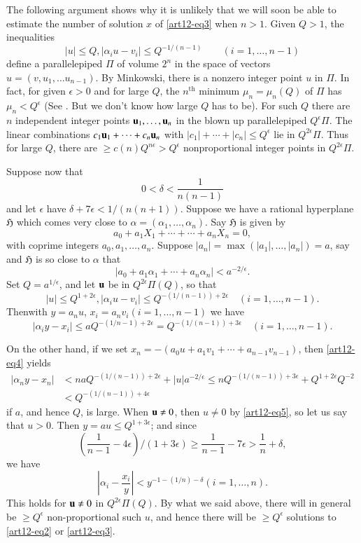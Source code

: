 The following argument shows why it is unlikely that we will soon be able to estimate the number of solution $x$ of \eqref{art12-eq3} when $n>1$. Given $Q>1$, the inequalities
$$
|u|\leq Q, |\alpha_{i}u-v_{i}|\leq Q^{-1/(n-1)}\qquad (i=1,\ldots,n-1)
$$
define a parallelepiped $\Pi$ of volume $2^{n}$ in the space of vectors $u=(v,u_{1},\ldots u_{n-1})$. By Minkowski, there is a nonzero integer point $u$ in $\Pi$. In fact, for given $\epsilon>0$ and for large $Q$, the $n^{\text{th}}$ minimum $\mu_{n}=\mu_{n}(Q)$ of $\Pi$ has $\mu_{n}<Q^{\epsilon}$ (See \cite{art12-key9}. But we don't know how large $Q$ has to be). For such $Q$ there are $n$ independent integer points $\mathbf{u}_{1},\ldots,\mathbf{u}_{n}$ in the blown up parallelepiped $Q^{\epsilon}\Pi$. The linear combinations $c_{1}\mathbf{u}_{1}+\cdots+c_{n}\mathbf{u}_{n}$ with $|c_{1}|+\cdots+|c_{n}|\leq Q^{\epsilon}$ lie in $Q^{2\epsilon}\Pi$. Thus for large $Q$, there are $\geq c(n)Q^{n\epsilon}>Q^{\epsilon}$ nonproportional integer points in $Q^{2\epsilon}\Pi$.

Suppose now that
$$
0<\delta <\frac{1}{n(n-1)}
$$
and let $\epsilon$ have $\delta+7\epsilon<1/(n(n+1))$. Suppose we have a rational hyperplane $\mathfrak{H}$ which comes very close to $\alpha=(\alpha_{1},\ldots,\alpha_{n})$. Say $\mathfrak{H}$ is given by
$$
a_{0}+a_{1}X_{1}+\cdots+\cdots+a_{n}X_{n}=0,
$$
with coprime integers $a_{0},a_{1},\ldots,a_{n}$. Suppose $|a_{n}|=\max (|a_{1}|,\ldots,|a_{n}|)=a$, say and $\mathfrak{H}$ is so close to $\alpha$ that
\begin{equation}
|a_{0}+a_{1}\alpha_{1}+\cdots+a_{n}\alpha_{n}|<a^{-2/\epsilon}.\label{art12-eq4}
\end{equation}
Set $Q=a^{1/\epsilon}$, and let $\mathbf{u}$ be in $Q^{2\epsilon}\Pi(Q)$, so that
\begin{equation}
|u|\leq Q^{1+2\epsilon}, |\alpha_{i}u-v_{i}|\leq Q^{-(1/(n-1))+2\epsilon}\quad (i=1,\ldots,n-1).\label{art12-eq5}
\end{equation}
Then\pageoriginale with $y=a_{n}u$, $x_{i}=a_{n}v_{i}(i=1,\ldots,n-1)$ we have
$$
|\alpha_{i}y-x_{i}|\leq aQ^{-(1/n-1)+2\epsilon}=Q^{-(1/(n-1))+3\epsilon}\quad (i=1,\ldots,n-1).
$$

On the other hand, if we set $x_{n}=-(a_{0}u+a_{1}v_{1}+\cdots+a_{n-1}v_{n-1})$, then \eqref{art12-eq4} yields
\begin{align*}
|\alpha_{n}y-x_{n}| &< naQ^{-(1/(n-1))+2\epsilon}+|u|a^{-2/\epsilon}\leq nQ^{-(1/(n-1))+3\epsilon}+Q^{1+2\epsilon}Q^{-2}\\
&< Q^{-(1/(n-1))+4\epsilon}
\end{align*}
if $a$, and hence $Q$, is large. When $\mathbf{u}\neq 0$, then $u\neq 0$ by \eqref{art12-eq5}, so let us say that $u>0$. Then $y=au\leq Q^{1+3\epsilon}$; and since
$$
\left(\frac{1}{n-1}-4\epsilon\right)\Big/ (1+3\epsilon)\geq \frac{1}{n-1}-7\epsilon>\frac{1}{n}+\delta,
$$
we have
$$
\left| \alpha_{i}-\frac{x_{i}}{y}\right|<y^{-1-(1/n)-\delta}(i=1,\ldots,n).
$$
This holds for $\mathbf{u}\neq 0$ in $Q^{2\epsilon}\Pi(Q)$. By what we said above, there will in general be $\geq Q^{\epsilon}$ non-proportional such $u$, and hence there will be $\geq Q^{\epsilon}$ solutions to \eqref{art12-eq2} or \eqref{art12-eq3}.

